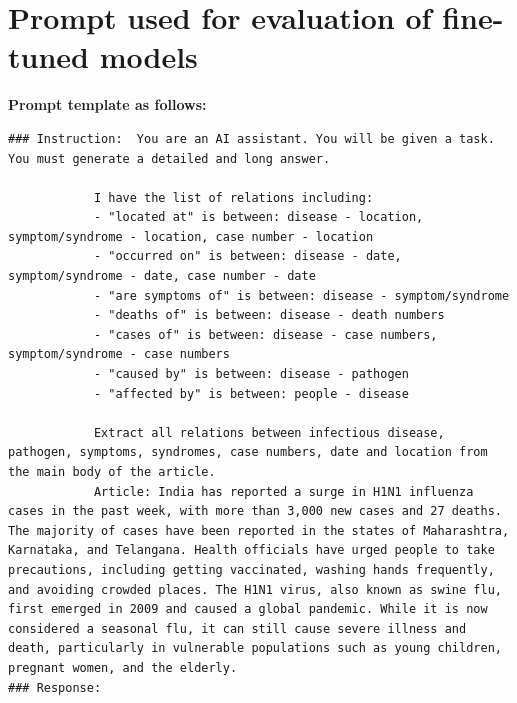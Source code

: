 \documentclass[letterpaper]{article} %
\begin{document}
\section{Prompt used for evaluation of fine-tuned models}


\textbf{Prompt template as follows:}
\begin{lstlisting}
### Instruction:  You are an AI assistant. You will be given a task. You must generate a detailed and long answer.
 
            I have the list of relations including: 
            - "located at" is between: disease - location, symptom/syndrome - location, case number - location
            - "occurred on" is between: disease - date, symptom/syndrome - date, case number - date
            - "are symptoms of" is between: disease - symptom/syndrome
            - "deaths of" is between: disease - death numbers
            - "cases of" is between: disease - case numbers, symptom/syndrome - case numbers
            - "caused by" is between: disease - pathogen
            - "affected by" is between: people - disease

            Extract all relations between infectious disease, pathogen, symptoms, syndromes, case numbers, date and location from the main body of the article.
            Article: India has reported a surge in H1N1 influenza cases in the past week, with more than 3,000 new cases and 27 deaths. The majority of cases have been reported in the states of Maharashtra, Karnataka, and Telangana. Health officials have urged people to take precautions, including getting vaccinated, washing hands frequently, and avoiding crowded places. The H1N1 virus, also known as swine flu, first emerged in 2009 and caused a global pandemic. While it is now considered a seasonal flu, it can still cause severe illness and death, particularly in vulnerable populations such as young children, pregnant women, and the elderly.
### Response:
\end{lstlisting}
\end{document}
